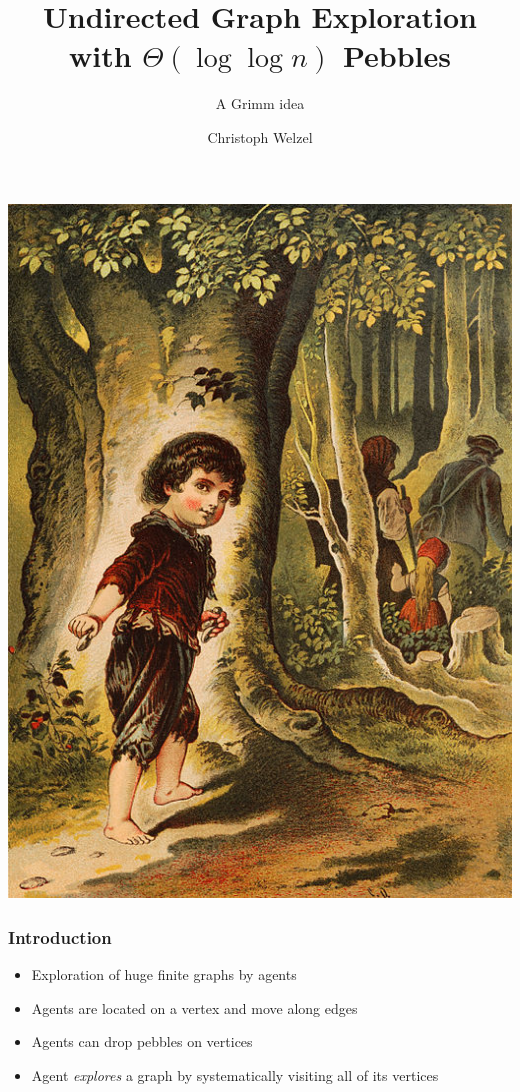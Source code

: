 \documentclass{beamer}
\title{Undirected Graph Exploration with $\Theta(\log\log n)$ Pebbles}
\subtitle{A Grimm idea}
\author{Christoph Welzel}
\institute{Logik und Theorie diskreter Systeme, RWTH Aachen}
\begin{document}
\maketitle
\begin{frame}
  \begin{center}
    \includegraphics{hanselgretel.jpg}
  \end{center}
\end{frame}

\begin{frame}
  \frametitle{Introduction}
  \begin{itemize}
    \item Exploration of huge finite graphs by agents
    \item Agents are located on a vertex and move along edges
    \item Agents can drop pebbles on vertices
    \item Agent \emph{explores} a graph by systematically visiting all of
      its vertices
  \end{itemize}
\end{frame}
\end{document}

